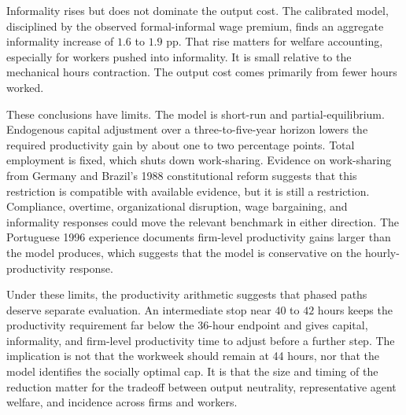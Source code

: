 Informality rises but does not dominate the output cost. The calibrated model, disciplined by the observed formal-informal wage premium, finds an aggregate informality increase of $1.6$ to $1.9$ pp. That rise matters for welfare accounting, especially for workers pushed into informality. It is small relative to the mechanical hours contraction. The output cost comes primarily from fewer hours worked.

These conclusions have limits. The model is short-run and partial-equilibrium. Endogenous capital adjustment over a three-to-five-year horizon lowers the required productivity gain by about one to two percentage points. Total employment is fixed, which shuts down work-sharing. Evidence on work-sharing from Germany \citep{Hunt1996} and Brazil's 1988 constitutional reform \citep{GonzagaMenezesFilhoCamargo2003} suggests that this restriction is compatible with available evidence, but it is still a restriction. Compliance, overtime, organizational disruption, wage bargaining, and informality responses could move the relevant benchmark in either direction. The Portuguese 1996 experience \citep{AsaiLopesTondini2024} documents firm-level productivity gains larger than the model produces, which suggests that the model is conservative on the hourly-productivity response.

Under these limits, the productivity arithmetic suggests that phased paths deserve separate evaluation. An intermediate stop near $40$ to $42$ hours keeps the productivity requirement far below the 36-hour endpoint and gives capital, informality, and firm-level productivity time to adjust before a further step. The implication is not that the workweek should remain at 44 hours, nor that the model identifies the socially optimal cap. It is that the size and timing of the reduction matter for the tradeoff between output neutrality, representative agent welfare, and incidence across firms and workers.
